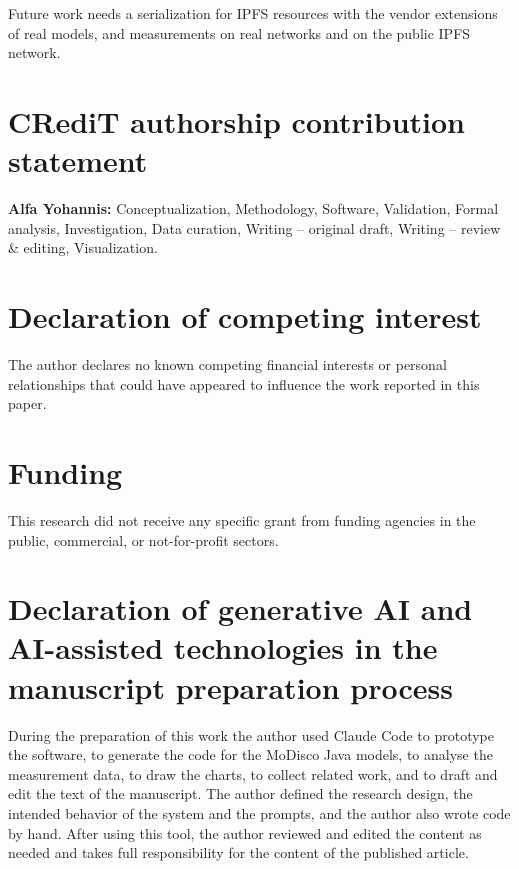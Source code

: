 \documentclass[5p,times,twocolumn]{elsarticle}
\theoremstyle{definition}
\theoremstyle{plain}
\begin{document}
Future work needs a serialization for IPFS resources with the vendor extensions of real models, and measurements on real networks and on the public IPFS network.


\section*{CRediT authorship contribution statement}

\textbf{Alfa Yohannis:} Conceptualization, Methodology, Software, Validation, Formal analysis, Investigation, Data curation, Writing -- original draft, Writing -- review \& editing, Visualization.

\section*{Declaration of competing interest}

The author declares no known competing financial interests or personal relationships that could have appeared to influence the work reported in this paper.

\section*{Funding}

This research did not receive any specific grant from funding agencies in the public, commercial, or not-for-profit sectors.

\section*{Declaration of generative AI and AI-assisted technologies in the manuscript preparation process}

During the preparation of this work the author used Claude Code to prototype the software, to generate the code for the MoDisco Java models, to analyse the measurement data, to draw the charts, to collect related work, and to draft and edit the text of the manuscript. The author defined the research design, the intended behavior of the system and the prompts, and the author also wrote code by hand. After using this tool, the author reviewed and edited the content as needed and takes full responsibility for the content of the published article.
\end{document}
